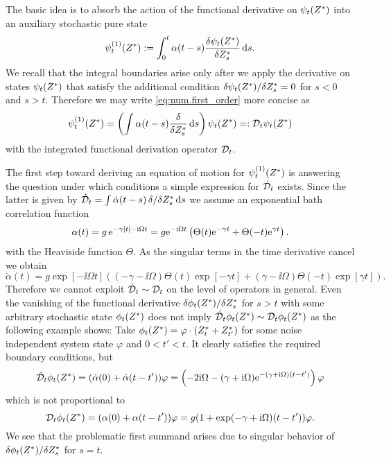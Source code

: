 The basic idea is to absorb the action of the functional derivative on $\psitZ$ into an auxiliary stochastic pure state
\begin{equation}
  \psitZ[1] := \int_0^t \alpha(t - s) \frac{\delta \psi_t(\ZZ)}{\delta \ZZ_s} \dd s.
  \label{eq:num.first_order}
\end{equation}
We recall that the integral boundaries arise only after we apply the derivative on states $\psi_t({Z}^*)$ that satisfy the additional condition $\delta \psitZ / \delta \ZZ_s = 0$ for $ s < 0$ and $s > t$.
Therefore we may write \autoref{eq:num.first_order} more concise as
\begin{equation*}
  \psitZ[1] = \left( \int \alpha(t - s) \frac{\delta}{\delta \ZZ_s} \dd s \right) \psitZ =: \adjZZ_t \psitZ
\end{equation*}
with the integrated functional derivation operator $\mathcal{D}_t$.

The first step toward deriving an equation of motion for $\psitZ[1]$ is answering the question under which conditions a simple expression for $\dot{\mathcal{D}}_t$ exists.
Since the latter is given by $\dot{\mathcal{D}}_t = \int\dot\alpha(t-s) \, \delta / \delta {Z}^*_s \, \mathrm{d} s$ we assume an exponential bath correlation function
\begin{equation*}
  \alpha(t) = g \, \exp[-\gamma \abs{t} - \ii \Omega t] = g \exp[-\ii \Omega t] \left( \Theta(t) \exp[-\gamma t] + \Theta(-t) \exp[\gamma t] \right).
\end{equation*}
with the Heaviside function $\Theta$.
As the singular terms in the time derivative cancel we obtain
\begin{equation*}
  \dot\alpha(t) = g \exp[-\ii \Omega t] \left( (-\gamma - \ii\Omega) \Theta(t) \exp[-\gamma t] + (\gamma - \ii\Omega)\Theta(-t)\exp[\gamma t] \right).
\end{equation*}
Therefore we cannot exploit $\dot{\mathcal{D}}_t \sim \mathcal{D}_t$ on the level of operators in general.
Even the vanishing of the functional derivative $\delta \phi_t({Z}^*) / \delta {Z}^*_s$ for $s > t$ with some arbitrary stochastic state $\phi_t({Z}^*)$ does not imply $\dot{\mathcal{D}}_t \phi_t({Z}^*) \sim \mathcal{D}_t\phi_t({Z}^*)$ as the following example shows:
Take $\phi_t({Z}^*) = \varphi \cdot ({Z}^*_t + {Z}^*_{t'})$ for some noise independent system state $\varphi$ and $0 < t' < t$.
It clearly satisfies the required boundary conditions, but
\begin{equation*}
  \dot\adjZZ_t \phi_t(\ZZ) = (\dot\alpha(0) + \dot\alpha(t-t')) \varphi = \left( -2\ii\Omega - (\gamma + \ii\Omega) \exp[-(\gamma + \ii\Omega) (t-t')] \right) \varphi
\end{equation*}
which is not proportional to
\begin{equation*}
  \adjZZ_t \phi_t(\ZZ) = (\alpha(0) + \alpha(t - t')) \varphi = g (1 + \exp(-\gamma + \ii \Omega)(t-t')) \varphi.
\end{equation*}
We see that the problematic first summand arises due to singular behavior of $\delta \phi_t({Z}^*) / \delta {Z}^*_s$ for $s = t$.

